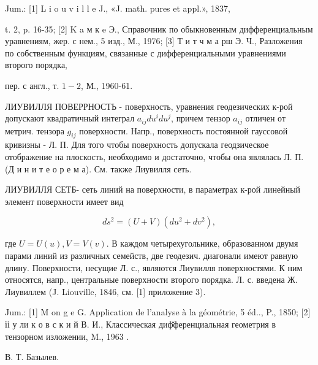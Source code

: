 \documentclass[10pt]{article}
\begin{document}
Jum.: [1] L i o u v i l l e J., «J. math. pures et appl.», 1837,

t. 2, p. 16-35; [2] K a м к e Э., Справочник по обыкновенным дифференциальным уравнениям, жер. с нем., 5 изд., М., 1976; [3] Т и т ч м а рш Э. Ч., Разложения по собственным функциям, связанные с дифференциальными уравнениями второго порядка,

пер. с англ., т. $1-2$, М., 1960-61.



ЛИУВИЛЛЯ ПОВЕРРНОСТЬ - поверхность, уравнения геодезических к-рой допускают квадратичный интеграл $a_{i j} d u^{i} d u^{j}$, причем тензор $a_{i j}$ отличен от метрич. тензора $g_{i j}$ поверхности. Напр., поверхность постоянной гауссовой кривизны - Л. П. Для того чтобы поверхность допускала геодзическое отображение на плоскость, необходимо и достаточно, чтобы она являлась Л. П. (Д и н и т е о р е м а). См. также Лиувилля сеть.



ЛИУВИЛЛЯ СЕТБ- сеть линий на поверхности, в параметрах к-рой линейный элемент поверхности имеет вид



\[

d s^{2}=(U+V)\left(d u^{2}+d v^{2}\right),

\]



где $U=U(u), V=V(v)$. В каждом четырехугольнике, образованном двумя парами линий из различных семейств, две геодезич. диагонали имеют равную длину. Поверхности, несущие Л. с., являются Лиувилля поверхностями. К ним относятся, напр., центральные поверхности второго порядка. Л. с. введена Ж. Лиувиллем (J. Liouville, 1846, см. [1] приложение 3).



Jum.: [1] M on g e G. Application de l'analyse à la géométrie, 5 éd.., P., 1850; [2] їі у ли к о в с к и й В. И., Классическая диф̆ференциальная геометрия в тензорном изложении, M., 1963 .



В. Т. Базылев.
\end{document}
